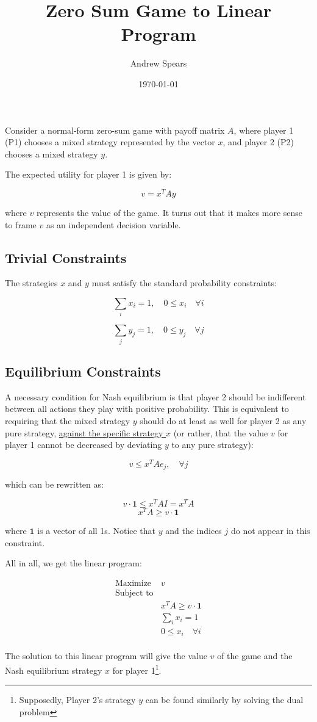 \documentclass[a4paper,12pt]{article}
\title{Zero Sum Game to Linear Program}
\author{Andrew Spears}
\date{\today}
\begin{document}
\maketitle

Consider a normal-form zero-sum game with payoff matrix \( A \), where player 1 (P1) chooses a mixed strategy represented by the vector \( x \), and player 2 (P2) chooses a mixed strategy \( y \).

The expected utility for player 1 is given by:

\[
v = x^T A y
\]

where \( v \) represents the value of the game. It turns out that it makes more sense to frame $v$ as an independent decision variable.

\subsection*{Trivial Constraints}

The strategies \( x \) and \( y \) must satisfy the standard probability constraints:

\[
\sum_i x_i = 1, \quad 0 \leq x_i \quad \forall i
\]

\[
\sum_j y_j = 1, \quad 0 \leq y_j \quad \forall j
\]



\subsection*{Equilibrium Constraints}

A necessary condition for Nash equilibrium is that player 2 should be indifferent between all actions they play with positive probability. This is equivalent to requiring that the mixed strategy \( y \) should do at least as well for player 2 as any pure strategy, \underline{against the specific strategy \( x \)} (or rather, that the value $v$ for player 1 cannot be decreased by deviating $y$ to any pure strategy):

\[
v \leq x^T A e_j, \quad \forall j
\]

which can be rewritten as:

\[
v \cdot \mathbf{1} \leq x^T A I = x^T A
\]
\[ x^T A \geq v \cdot \mathbf{1} \]

where $\mathbf{1}$ is a vector of all 1s.
Notice that $y$ and the indices $j$ do not appear in this constraint.

All in all, we get the linear program:

\begin{equation}
\boxed{
\begin{array}{rl}
    \text{Maximize } & v \\
    \text{Subject to} & \\
    & x^T A \geq v \cdot \mathbf{1} \\
    & \sum_i x_i = 1 \\
    & 0 \leq x_i \quad \forall i \\
\end{array}
}
\end{equation}

The solution to this linear program will give the value \( v \) of the game and the Nash equilibrium strategy \( x \) for player 1\footnote{Supposedly, Player 2's strategy \( y \) can be found similarly by solving the dual problem}. 
\end{document}
